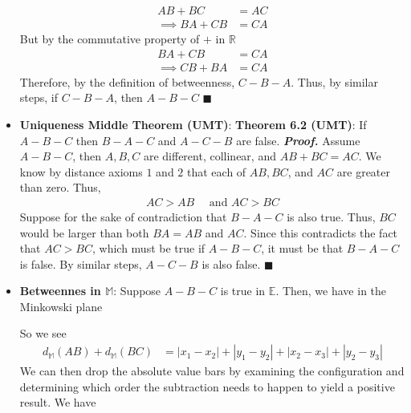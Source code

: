 \documentclass{report}
\begin{document}
\begin{itemize}
\begin{align*}
                AB + BC &= AC \\
                \implies BA + CB &= CA
            \end{align*}
            But by the commutative property of $+$ in $\mathbb{R} $
            \begin{align*}
                BA + CB &= CA \\
                \implies CB + BA &= CA 
            \end{align*}
            Therefore, by the definition of betweenness, $C-B-A$. Thus, by similar steps, if $C-B-A$, then $A-B-C$ \hspace*{\fill} $\blacksquare$
        \item \textbf{Uniqueness Middle Theorem (UMT)}:
            \bigbreak \noindent 
            \textbf{Theorem 6.2 (UMT)}: If $A-B-C$ then $B-A-C$ and $A-C-B$ are false.
            \bigbreak \noindent 
            \textbf{\textit{Proof.}} Assume $A-B-C$, then $A,B,C$ are different, collinear, and $AB + BC = AC$. We know by distance axioms $1$ and $2$ that each of $AB, BC$, and $AC$ are greater than zero. Thus,
            \begin{align*}
                AC > AB \quad \text{ and } AC > BC
            \end{align*}
            Suppose for the sake of contradiction that $B-A-C$ is also true. Thus, $BC$ would be larger than both $BA=AB$ and $AC$. 
            \bigbreak \noindent 
            Since this contradicts the fact that $AC > BC$, which must be true if $A-B-C$, it must be that $B-A-C$ is false. By similar steps, $A-C-B$ is also false. \hspace*{\fill} $\blacksquare $ 
        \item \textbf{Betweennes in $\mathbb{M}$}: Suppose $A-B-C$ is true in $\mathbb{E}$. Then, we have in the Minkowski plane
            \bigbreak \noindent 
            \begin{figure}[ht]
                \centering
                \label{fig:bet}
            \end{figure}
            \bigbreak \noindent 
            So we see
            \begin{align*}
                d_{\mathbb{M}}(AB) + d_{\mathbb{M}}(BC) &= \left\lvert x_{1} -x_{2} \right\rvert + \left\lvert y_{1} - y_{2} \right\rvert + \left\lvert x_{2} - x_{3} \right\rvert + \left\lvert y_{2} - y_{3} \right\rvert
            \end{align*}
            \bigbreak \noindent 
            We can then drop the absolute value bars by examining the configuration and determining which order the subtraction needs to happen to yield a positive result. We have

\end{itemize}
\end{document}
